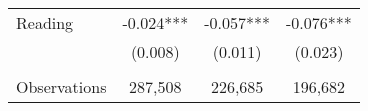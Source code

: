 {\begin{tabular}{lccc}
\hspace{3mm}Reading &      -0.024***&      -0.057***&      -0.076***\\
                    &     (0.008)   &     (0.011)   &     (0.023)   \\
                    &               &               &               \\
\hspace{3mm}Observations&     287,508   &     226,685   &     196,682   \\
 

\bottomrule
\end{tabular}
}
